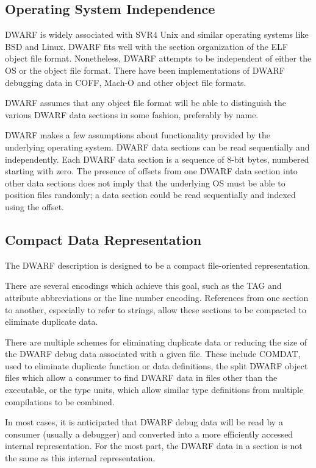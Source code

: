 \subsection{Operating System Independence}
DWARF is widely associated with SVR4 Unix and similar operating 
systems like BSD and Linux.  DWARF fits well with the section 
organization of the ELF object file format. Nonetheless, DWARF 
attempts to be independent of either the OS or the object file 
format.  There have been implementations of DWARF debugging 
data in 
\bb
COFF, Mach-O and other object file formats. 
\eb

DWARF assumes that any object file format will be able to 
distinguish the various DWARF data sections in some fashion, 
preferably by name. 

DWARF makes a few assumptions about functionality provided by 
the underlying operating system.  DWARF data sections can be 
read sequentially and independently.
\bb\eb
Each DWARF data section is a \bb\eb sequence of 8-bit bytes, 
numbered starting with zero.  The presence of offsets from one 
DWARF data section into other data sections does not imply that 
the underlying OS must be able to position files randomly; a 
data section could be read sequentially and indexed using the offset. 

\subsection{Compact Data Representation} 
The DWARF description is designed to be a compact file-oriented 
representation.\bb\eb

There are several encodings which achieve this goal, such as the 
TAG and attribute abbreviations or the line number encoding.  
References from one section to another, especially to refer to 
strings, allow these sections to be compacted to eliminate 
duplicate data. 

There are multiple schemes for eliminating duplicate data or 
reducing the size of the DWARF debug data associated with a 
given file.  These include COMDAT, used to eliminate duplicate 
function or data definitions, the split DWARF object files 
which allow a consumer to find DWARF data in files other than 
the executable, or the type units, which allow similar type 
definitions from multiple compilations to be combined. 

\bb
In most cases, it is anticipated that DWARF 
debug data will be read by a consumer (usually a debugger) and 
converted into a more efficiently accessed internal representation.  
For the most part, the DWARF data in a section is not the same as 
this internal representation.
\eb

